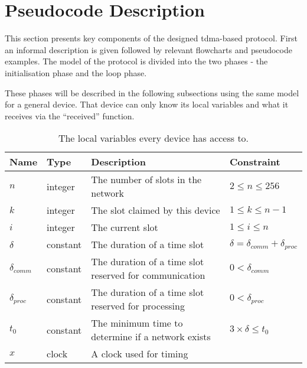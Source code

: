 \section{Pseudocode Description}\label{sec:Pseudo}
This section presents key components of the designed \gls{tdma}-based protocol. 
First an informal description is given followed by relevant flowcharts and pseudocode examples. 
The model of the protocol is divided into the two phases - the initialisation phase and the loop phase. 

These phases will be described in the following subsections using the same model for a general device. 
That device can only know its local variables and what it receives via the \enquote{received} function.

\begin{table}[H]
    \begin{tabularx}{\textwidth}{l|l|X|l}
        \toprule
        Name                & Type      & Description & Constraint \\
        \midrule
        $n$                 & integer   & The number of slots in the network                        & $2 \leq n \leq 256$\\
        $k$                 & integer   & The slot claimed by this device                           & $1 \leq k \leq n - 1$\\
        $i$                 & integer   & The current slot                                          & $1 \leq i \leq n$\\
        $\delta$            & constant   & The duration of a time slot                               & $\delta = \delta_{comm} + \delta_{proc}$\\
        $\delta_{comm}$     & constant   & The duration of a time slot reserved for communication    & $0 < \delta_{comm}$ \\
        $\delta_{proc}$     & constant   & The duration of a time slot reserved for processing       & $0 < \delta_{proc}$ \\
        $t_0$               & constant  & The minimum time to determine if a network exists         & $3 \times \delta \leq t_0$ \\
        $x$                 & clock     & A clock used for timing\\
        \bottomrule
    \end{tabularx}
    \caption{The local variables every device has access to.}
    \label{tab:locals}
\end{table}

